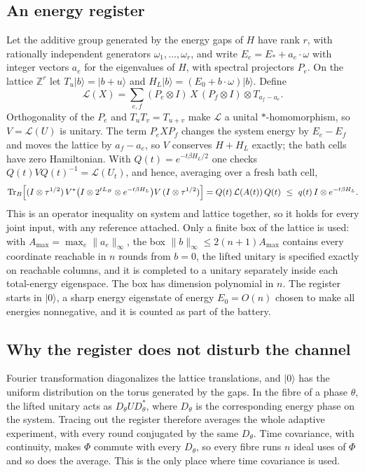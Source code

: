 \documentclass[11pt]{article}
\theoremstyle{definition}
\theoremstyle{remark}
\newcommand{\Tr}{\operatorname{Tr}}
\begin{document}
\subsection{An energy register}

Let the additive group generated by the energy gaps of $H$ have rank $r$, with rationally independent generators $\omega_1,\dots,\omega_r$, and write $E_e=E_*+a_e\cdot\omega$ with integer vectors $a_e$ for the eigenvalues of $H$, with spectral projectors $P_e$. On the lattice $\mathbb Z^r$ let $T_u|b\rangle=|b+u\rangle$ and $H_L|b\rangle=(E_0+b\cdot\omega)|b\rangle$. Define
\[
\mathcal L(X)=\sum_{e,f}(P_e\otimes I)\,X\,(P_f\otimes I)\otimes T_{a_f-a_e}.
\]
Orthogonality of the $P_e$ and $T_uT_v=T_{u+v}$ make $\mathcal L$ a unital $*$-homomorphism, so $V=\mathcal L(U)$ is unitary. The term $P_eXP_f$ changes the system energy by $E_e-E_f$ and moves the lattice by $a_f-a_e$, so $V$ conserves $H+H_L$ exactly; the bath cells have zero Hamiltonian. With $Q(t)=e^{-t\beta H_L/2}$ one checks $Q(t)VQ(t)^{-1}=\mathcal L(U_t)$, and hence, averaging over a fresh bath cell,
\begin{equation}\label{eq:effect}
\Tr_B\Bigl[(I\otimes\tau^{1/2})\,V^*\bigl(I\otimes2^{tL_B}\otimes e^{-t\beta H_L}\bigr)V\,(I\otimes\tau^{1/2})\Bigr]=Q(t)\,\mathcal L(A(t))\,Q(t)\ \le\ q(t)\,I\otimes e^{-t\beta H_L}.
\end{equation}
This is an operator inequality on system and lattice together, so it holds for every joint input, with any reference attached. Only a finite box of the lattice is used: with $A_{\max}=\max_e\|a_e\|_\infty$, the box $\|b\|_\infty\le2(n+1)A_{\max}$ contains every coordinate reachable in $n$ rounds from $b=0$, the lifted unitary is specified exactly on reachable columns, and it is completed to a unitary separately inside each total-energy eigenspace. The box has dimension polynomial in $n$. The register starts in $|0\rangle$, a sharp energy eigenstate of energy $E_0=O(n)$ chosen to make all energies nonnegative, and it is counted as part of the battery.

\subsection{Why the register does not disturb the channel}

Fourier transformation diagonalizes the lattice translations, and $|0\rangle$ has the uniform distribution on the torus generated by the gaps. In the fibre of a phase $\theta$, the lifted unitary acts as $D_\theta UD_\theta^*$, where $D_\theta$ is the corresponding energy phase on the system. Tracing out the register therefore averages the whole adaptive experiment, with every round conjugated by the same $D_\theta$. Time covariance, with continuity, makes $\Phi$ commute with every $D_\theta$, so every fibre runs $n$ ideal uses of $\Phi$ and so does the average. This is the only place where time covariance is used.
\end{document}
